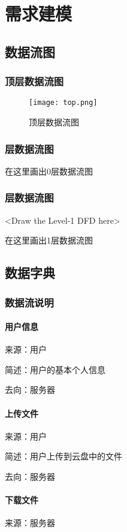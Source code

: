 \chapter{需求建模 }
\section{数据流图}
\subsection{顶层数据流图}

\begin{figure}[ht]
\centering
\texttt{[image: top.png]}
\caption{顶层数据流图}\label{fig:noted-figure}
\end{figure}

\subsection{层数据流图}

在这里画出0层数据流图

\subsection{层数据流图}
<Draw the Level-1 DFD here>

在这里画出1层数据流图

\section{数据字典}
\subsection{数据流说明}
\subsubsection{用户信息}
来源：用户

简述：用户的基本个人信息

去向：服务器

\subsubsection{上传文件}
来源：用户

简述：用户上传到云盘中的文件

去向：服务器

\subsubsection{下载文件}
来源：服务器

